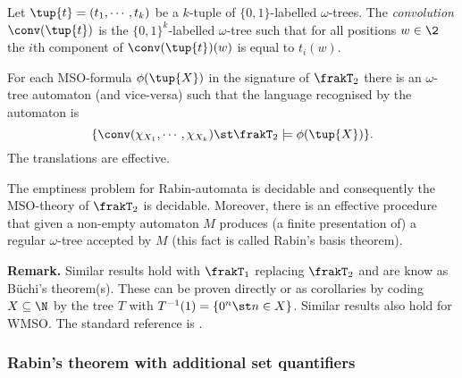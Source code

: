 \begin{definition} \label{AS:dfn:convtrees}
Let $\tup{t} = (t_1,\cdots,t_k)$
be a $k$-tuple of $\{0,1\}$-labelled $\omega$-trees. 
The {\em convolution} $\conv(\tup{t})$ is the $\{0,1\}^k$-labelled $\omega$-tree such that for all positions $w \in \2$
the $i$th component of $\conv(\tup{t})(w)$ is equal to $t_i(w)$.
\end{definition} 

\begin{theorem}
For each MSO-formula $\phi(\tup{X})$ in the signature of $\frakT_2$ there is an $\omega$-tree automaton (and vice-versa) such that the language recognised by the automaton is
\[
\{\conv(\chi_{X_1},\cdots,\chi_{X_k}) \st \frakT_2 \models \phi(\tup{X})\}.
\]
The translations are effective.
\end{theorem}

\begin{proposition} \cite{Thom90}
The emptiness problem for Rabin-automata is decidable and consequently the MSO-theory of $\frakT_2$ is decidable.
Moreover, there is an effective procedure that given a non-empty automaton $M$ produces (a finite presentation of) a 
regular $\omega$-tree accepted by $M$ (this fact is called Rabin's basis theorem).
\end{proposition}

{\bf Remark.} Similar results hold with $\frakT_1$ replacing $\frakT_2$ and are know as B\"uchi's theorem(s). 
These can be proven directly  or as corollaries by coding $X \subseteq \N$ by the tree $T$ with $T^{-1}(1) = \{0^n \st n \in X\}$.
Similar results also hold for WMSO. The standard reference is \cite{Thom90}.

\subsubsection*{Rabin's theorem with additional set quantifiers} \label{AS:sec:beyond}


